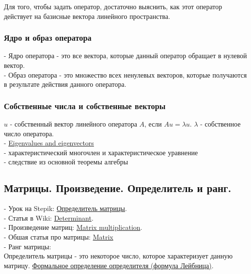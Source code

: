 \documentclass{article}
\begin{document}
Для того, чтобы задать оператор, достаточно выяснить, как этот оператор действует на базисные вектора линейного пространства.

\subsubsection{Ядро и образ оператора}

- Ядро оператора - это все вектора, которые данный оператор обращает в нулевой вектор. \\
- Образ оператора - это множество всех ненулевых векторов, которые получаются в результате действия данного оператора. \\

\subsubsection{Собственные числа и собственные векторы}

$u$ - собственный вектор линейного оператора $A$, если $Au = \lambda u$. $\lambda$ - собственное число оператора. \\

- \href{https://en.wikipedia.org/wiki/Eigenvalues_and_eigenvectors}{Eigenvalues and eigenvectors} \\
- характеристический многочлен и характеристическое уравнение \\
- следствие из основной теоремы алгебры

\subsection{Матрицы. Произведение. Определитель и ранг.}

- Урок на Stepik: \href{https://stepik.org/lesson/44077/step/1?unit=21901}{Определитель матрицы}. \\
- Статья в Wiki: \href{https://en.wikipedia.org/wiki/Determinant}{Determinant}. \\
- Произведение матриц: \href{https://en.wikipedia.org/wiki/Matrix_multiplication}{Matrix multiplication}. \\
- Обшая статья про матрицы: \href{https://en.wikipedia.org/wiki/Matrix_(mathematics)}{Matrix} \\
- Ранг матрицы: \href{https://en.wikipedia.org/wiki/Rank_(linear_algebra)}{} \\

Определитель матрицы - это некоторое число, которое характеризует данную матрицу. \href{https://en.wikipedia.org/wiki/Leibniz_formula_for_determinants}{Формальное определение определителя (формула Лейбница)}.
\end{document}
